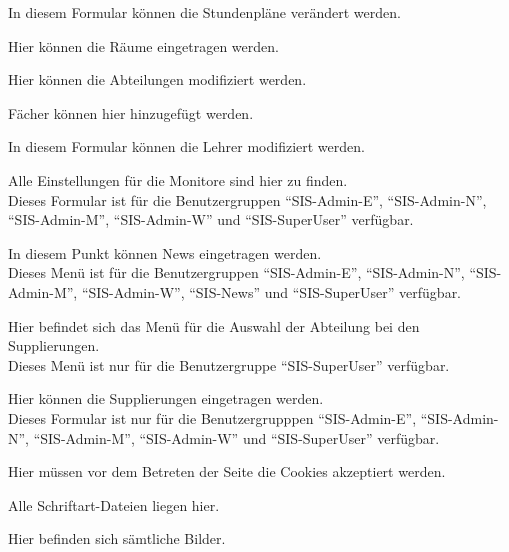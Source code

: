 \begin{description}[style=nextline]
\begin{description}[style=nextline]
\begin{description}[style=nextline]
							In diesem Formular können die Stundenpläne verändert werden.
						\item[./rooms/]
							Hier können die Räume eingetragen werden.
						\item[./sections/]
							Hier können die Abteilungen modifiziert werden.
						\item[./subjects/]
							Fächer können hier hinzugefügt werden.
						\item[./teachers/]
							In diesem Formular können die Lehrer modifiziert werden.
					\end{description}
				\item[./monitors/]
					Alle Einstellungen für die Monitore sind hier zu finden.\\
					Dieses Formular ist für die Benutzergruppen \enquote{SIS-Admin-E}, \enquote{SIS-Admin-N}, \enquote{SIS-Admin-M}, \enquote{SIS-Admin-W} und \enquote{SIS-SuperUser} verfügbar.
				\item[./news/]
					In diesem Punkt können News eingetragen werden.\\
					Dieses Menü ist für die Benutzergruppen \enquote{SIS-Admin-E}, \enquote{SIS-Admin-N}, \enquote{SIS-Admin-M}, \enquote{SIS-Admin-W}, \enquote{SIS-News} und \enquote{SIS-SuperUser} verfügbar.
				\item[./substitudes/]
					Hier befindet sich das Menü für die Auswahl der Abteilung bei den Supplierungen.\\
					Dieses Menü ist nur für die Benutzergruppe \enquote{SIS-SuperUser} verfügbar.
					\begin{description}[style=nextline]
						\item[./form/]
							Hier können die Supplierungen eingetragen werden.\\
							Dieses Formular ist nur für die Benutzergrupppen \enquote{SIS-Admin-E}, \enquote{SIS-Admin-N}, \enquote{SIS-Admin-M}, \enquote{SIS-Admin-W} und \enquote{SIS-SuperUser} verfügbar.
					\end{description}
		\end{description}	
	\item[/cookies/]
			Hier müssen vor dem Betreten der Seite die Cookies akzeptiert werden.
		\item[/data/]
			\begin{description}[style=nextline]
				\item[./fonts/]
					Alle Schriftart-Dateien liegen hier.
				\item[./images/]
					Hier befinden sich sämtliche Bilder.\\

\end{description}
\end{description}
